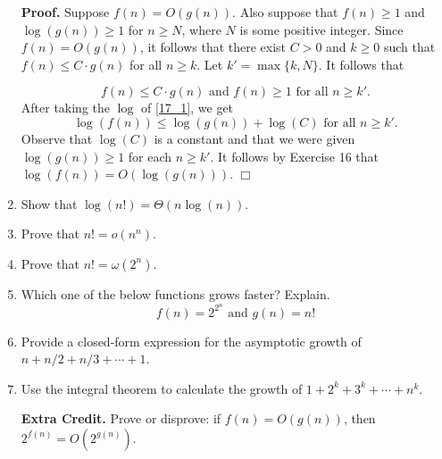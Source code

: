 \documentclass[9pt]{article}
\newcommand{\qed}{\hfill \ensuremath{\Box}}
\begin{document}
\begin{enumerate}
      \textbf{Proof.} Suppose $f(n) = O(g(n))$. Also suppose that $f(n) \ge 1$
      and $\log(g(n)) \ge 1$ for $n \ge N$, where $N$ is some positive integer.
      Since $f(n) = O(g(n))$, it follows that there exist $C > 0$ and $k \ge 0$
      such that $f(n) \le C \cdot g(n)$ for all $n \ge k$. Let
      $k' = \max\{k, N\}$. It follows that 

      \begin{equation} \label{17_1}
         f(n) \le C \cdot g(n) \text{ and } f(n) \ge 1 \text{ for all }n \ge k'.
      \end{equation}
      After taking the $\log$ of \eqref{17_1}, we get
      $$\log(f(n)) \le \log(g(n)) + \log(C) \text{ for all }n \ge k'.$$
      Observe that $\log(C)$ is a constant and that we were given
      $\log(g(n)) \ge 1$ for each $n \ge k'$. It follows by Exercise 16 that
      $\log(f(n)) = O(\log(g(n)))$. \qed
   \item Show that $\log(n!) = \Theta(n\log(n))$.
   \item Prove that $n! = o(n^n)$.
   \item Prove that $n! = \omega(2^n)$.
   \item Which one of the below functions grows faster? Explain.
         $$f(n) = 2^{2^n} \text{ and } g(n) = n!$$
   \item Provide a closed-form expression for the asymptotic growth of
         $n + n/2 + n/3 + \cdots + 1$.
   \item Use the integral theorem to calculate the growth of
         $1 + 2^k + 3^k + \cdots + n^k$.
   \item[\textbf{Extra Credit.}] Prove or disprove: if $f(n) = O(g(n))$, then
                                 $2^{f(n)} = O(2^{g(n)})$.
      
\end{enumerate}
\end{document}
